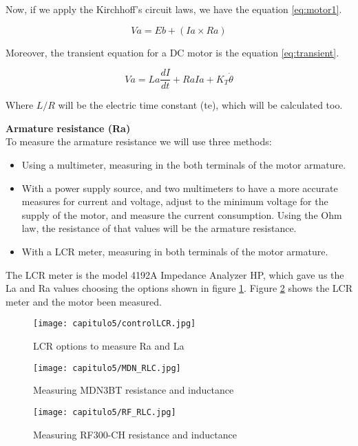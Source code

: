 Now, if we apply the Kirchhoff's circuit laws, we have the equation \ref{eq:motor1}.

\begin{equation}
Va=Eb+(Ia\times Ra)
\label{eq:motor1}
\end{equation}

Moreover, the transient equation for a \acrshort{DC} motor is the equation \ref{eq:transient}.

\begin{equation}
Va=La \frac{dI}{dt} +Ra Ia+K_T \dot{\theta}
\label{eq:transient}
\end{equation}

Where $L/R$ will be the electric time constant (te), which will be calculated too.

\textbf{Armature resistance (Ra)} \\

To measure the armature resistance we will use three methods:
\begin{itemize}
\item Using a multimeter, measuring in the both terminals of the motor armature. 
\item With a power supply source, and two multimeters to have a more accurate measures for current and voltage, adjust to the minimum voltage for the supply of the motor, and measure the current consumption. Using the Ohm law, the resistance of that values will be the armature resistance.
\item With a LCR meter, measuring in both terminals of the motor armature.
\end{itemize}

The LCR meter is the model 4192A Impedance Analyzer HP, which gave us the La and Ra values choosing the options shown in figure \ref{fig:controlLCR}. Figure \ref{fig:MDN_LCR} shows the LCR meter and the motor been measured. 

\begin{figure}[H]
\centering
		\texttt{[image: capitulo5/controlLCR.jpg]}
	\caption{LCR options to measure Ra and La}
	\label{fig:controlLCR}
\end{figure}

\begin{figure}[H]
\centering
		\texttt{[image: capitulo5/MDN\_RLC.jpg]}
	\caption{Measuring MDN3BT resistance and inductance}
	\label{fig:MDN_LCR}
\end{figure}

\begin{figure}[H]
\centering
		\texttt{[image: capitulo5/RF\_RLC.jpg]}
	\caption{Measuring RF300-CH resistance and inductance}
	\label{fig:RF_LCR}
\end{figure}

